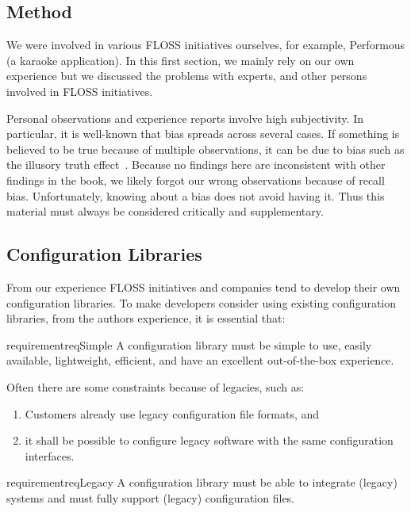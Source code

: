 \subsection{Method}

We were involved in various FLOSS initiatives ourselves, for example, Performous (a karaoke application).
In this first section, we mainly rely on our own experience but we discussed the problems with experts, and other persons involved in FLOSS initiatives.

Personal observations and experience reports involve high subjectivity.
In particular, it is well-known that bias spreads across several cases.
If something is believed to be true because of multiple observations, it can be due to bias such as the illusory truth effect~\cite{hasher1977frequency}.
Because no findings here are inconsistent with other findings in the book, we likely forgot our wrong observations because of recall bias.
Unfortunately, knowing about a bias does not avoid having it.
Thus this material must always be considered critically and supplementary.

\subsection{Configuration Libraries}

From our experience FLOSS initiatives and companies tend to develop their own configuration libraries.
To make developers consider using existing configuration libraries, from the authors experience, it is essential that:

\begin{restatable}{requirement}{reqSimple}
A configuration library must be simple to use, easily available, light\-weight, efficient, and have an excellent out-of-the-box experience.%
\label{req:simple}
\end{restatable}

Often there are some constraints because of legacies, such as:

\begin{enumerate}
\item Customers already use legacy configuration file formats, and
\item it shall be possible to configure legacy software with the same configuration interfaces.
\end{enumerate}

\begin{restatable}{requirement}{reqLegacy}
A configuration library must be able to integrate (legacy) systems and must fully support (legacy) configuration files.%
\label{req:legacy}
\end{restatable}


